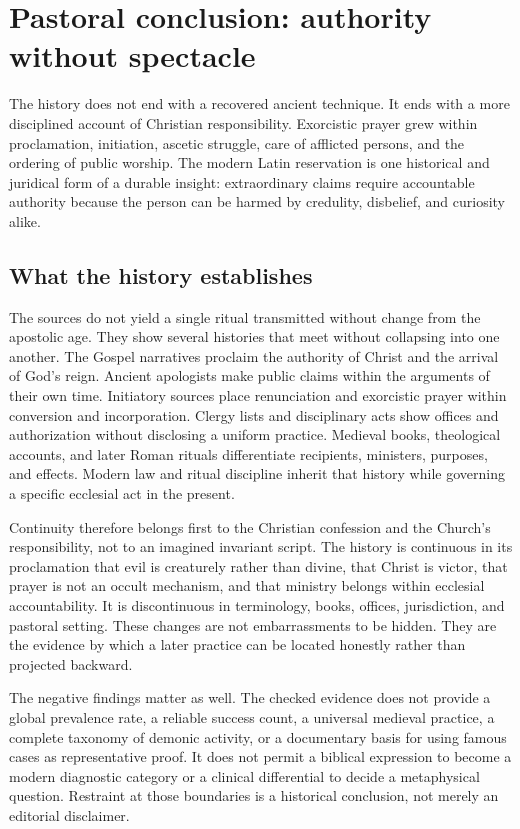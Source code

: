 \section{Pastoral conclusion: authority without spectacle}

The history does not end with a recovered ancient technique. It ends with a
more disciplined account of Christian responsibility. Exorcistic prayer grew
within proclamation, initiation, ascetic struggle, care of afflicted persons,
and the ordering of public worship. The modern Latin reservation is one
historical and juridical form of a durable insight: extraordinary claims
require accountable authority because the person can be harmed by credulity,
disbelief, and curiosity alike.

\subsection{What the history establishes}

The sources do not yield a single ritual transmitted without change from the
apostolic age. They show several histories that meet without collapsing into
one another. The Gospel narratives proclaim the authority of Christ and the
arrival of God's reign. Ancient apologists make public claims within the
arguments of their own time. Initiatory sources place renunciation and
exorcistic prayer within conversion and incorporation. Clergy lists and
disciplinary acts show offices and authorization without disclosing a uniform
practice. Medieval books, theological accounts, and later Roman rituals
differentiate recipients, ministers, purposes, and effects. Modern law and
ritual discipline inherit that history while governing a specific ecclesial
act in the present.

Continuity therefore belongs first to the Christian confession and the
Church's responsibility, not to an imagined invariant script. The history is
continuous in its proclamation that evil is creaturely rather than divine,
that Christ is victor, that prayer is not an occult mechanism, and that
ministry belongs within ecclesial accountability. It is discontinuous in
terminology, books, offices, jurisdiction, and pastoral setting. These changes
are not embarrassments to be hidden. They are the evidence by which a later
practice can be located honestly rather than projected backward.

The negative findings matter as well. The checked evidence does not provide a
global prevalence rate, a reliable success count, a universal medieval
practice, a complete taxonomy of demonic activity, or a documentary basis for
using famous cases as representative proof. It does not permit a biblical
expression to become a modern diagnostic category or a clinical differential
to decide a metaphysical question. Restraint at those boundaries is a
historical conclusion, not merely an editorial disclaimer.

